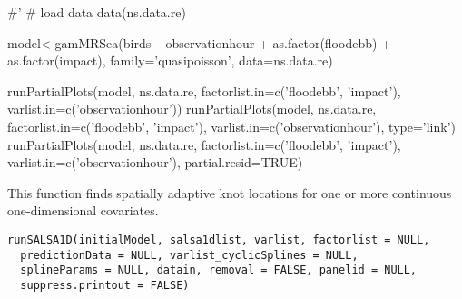 \documentclass[a4paper]{book}
\begin{document}
\begin{Examples}
\begin{ExampleCode}

#' # load data
data(ns.data.re)

model<-gamMRSea(birds ~ observationhour + as.factor(floodebb) + as.factor(impact),
           family='quasipoisson', data=ns.data.re)

runPartialPlots(model, ns.data.re, factorlist.in=c('floodebb', 'impact'),
                varlist.in=c('observationhour'))
runPartialPlots(model, ns.data.re, factorlist.in=c('floodebb', 'impact'),
                varlist.in=c('observationhour'), type='link')
runPartialPlots(model, ns.data.re, factorlist.in=c('floodebb', 'impact'),
                varlist.in=c('observationhour'), partial.resid=TRUE)
\end{ExampleCode}
\end{Examples}
%
\begin{Description}\relax
This function finds spatially adaptive knot locations for one or more continuous one-dimensional covariates.
\end{Description}
%
\begin{Usage}
\begin{verbatim}
runSALSA1D(initialModel, salsa1dlist, varlist, factorlist = NULL,
  predictionData = NULL, varlist_cyclicSplines = NULL,
  splineParams = NULL, datain, removal = FALSE, panelid = NULL,
  suppress.printout = FALSE)
\end{verbatim}
\end{Usage}
%
\end{document}
